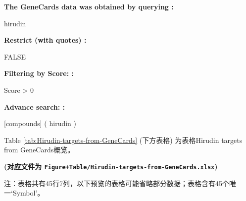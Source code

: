 \documentclass[
]{article}
\begin{document}
\begin{center}\begin{tcolorbox}[colback=gray!10, colframe=gray!50, width=0.9\linewidth, arc=1mm, boxrule=0.5pt]
\textbf{
The GeneCards data was obtained by querying
:}

\vspace{0.5em}

    hirudin

\vspace{2em}


\textbf{
Restrict (with quotes)
:}

\vspace{0.5em}

    FALSE

\vspace{2em}


\textbf{
Filtering by Score:
:}

\vspace{0.5em}

    Score > 0

\vspace{2em}


\textbf{
Advance search:
:}

\vspace{0.5em}

    [compounds] ( hirudin )

\vspace{2em}
\end{tcolorbox}
\end{center}

Table \ref{tab:Hirudin-targets-from-GeneCards} (下方表格) 为表格Hirudin targets from GeneCards概览。

\textbf{(对应文件为 \texttt{Figure+Table/Hirudin-targets-from-GeneCards.xlsx})}

\begin{center}\begin{tcolorbox}[colback=gray!10, colframe=gray!50, width=0.9\linewidth, arc=1mm, boxrule=0.5pt]注：表格共有45行7列，以下预览的表格可能省略部分数据；表格含有45个唯一`Symbol'。
\end{tcolorbox}
\end{center}
\end{document}
